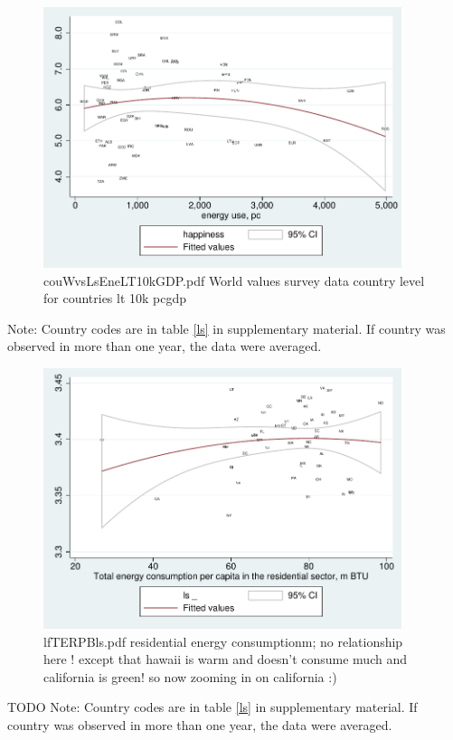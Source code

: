 \documentclass[10pt, letterpaper]{article}
\begin{document}
\begin{spacing}{1.4}
\begin{figure}[H]
 \includegraphics[height=3in]{graphsAndTables/couWvsLsEneLT10kGDP.pdf}\centering
\caption{couWvsLsEneLT10kGDP.pdf World values survey data country level for countries lt 10k pcgdp}\label{couWvsLsEneLT10kGDP.pdf}
\end{figure}
{\scriptsize Note: Country codes are in table \ref{ls} in supplementary
  material. If country was observed in more than one year, the data were averaged.}


\begin{figure}[H]
 \includegraphics[height=3in]{graphsAndTables/lfTERPBls.pdf}\centering
\caption{lfTERPBls.pdf residential energy consumptionm; no relationship here !
  except that hawaii is warm and doesn't consume much and california is green!
  so now zooming in on california :)}\label{grComTETPBgdp}
\end{figure}
{\scriptsize TODO Note: Country codes are in table \ref{ls} in supplementary
  material. If country was observed in more than one year, the data were averaged.}




\end{spacing}
\end{document}
